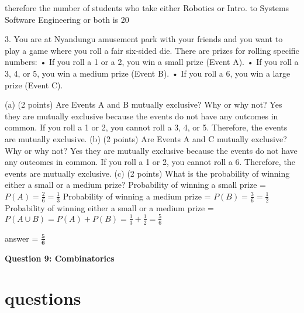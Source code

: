\documentclass{article}
\begin{document}
therefore the number of students who take either Robotics or Intro. to Systems Software Engineering or both is 20\newline

3. You are at Nyandungu amusement park with your friends and you want to play a game where you
roll a fair six-sided die. There are prizes for rolling specific numbers:\newline
• If you roll a 1 or a 2, you win a small prize (Event A).\newline
• If you roll a 3, 4, or 5, you win a medium prize (Event B).\newline
• If you roll a 6, you win a large prize (Event C).\newline

(a) (2 points) Are Events A and B mutually exclusive? Why or why not?\newline
Yes they are mutually exclusive because the events do not have any outcomes in common. If you roll a 1 or 2, you cannot roll a 3, 4, or 5. Therefore, the events are mutually exclusive.\newline\newline
(b) (2 points) Are Events A and C mutually exclusive? Why or why not?\newline
Yes they are mutually exclusive because the events do not have any outcomes in common. If you roll a 1 or 2, you cannot roll a 6. Therefore, the events are mutually exclusive.\newline\newline
(c) (2 points) What is the probability of winning either a small or a medium prize?\newline
Probability of winning a small prize = \(P(A) = \frac{2}{6} = \frac{1}{3}\)\newline
Probability of winning a medium prize = \(P(B) = \frac{3}{6} = \frac{1}{2}\)\newline
Probability of winning either a small or a medium prize = \(P(A \cup B) = P(A) + P(B) = \frac{1}{3} + \frac{1}{2} = \frac{5}{6}\)\newline

answer = \(\mathbf{\frac{5}{6}}\)\newline

\begin{center}
    \large \textbf{Question 9: Combinatorics}
\end{center}

\section{questions}
\end{document}
